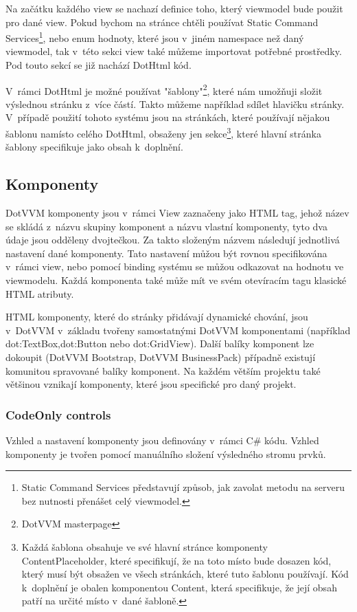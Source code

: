     Na začátku každého view se nachazí definice toho, který viewmodel bude použit pro dané view. Pokud bychom na stránce chtěli používat Static Command Services\footnote{Static Command Services představují způsob, jak zavolat metodu na serveru bez nutnosti přenášet celý viewmodel.}, nebo enum hodnoty, které jsou v~jiném namespace než daný viewmodel, tak v~této sekci view také můžeme importovat potřebné prostředky. Pod touto sekcí se již nachází DotHtml kód.
    
    V~rámci DotHtml je možné používat "šablony"\footnote{DotVVM masterpage}, které nám umožňuji složit výslednou stránku z~více částí. Takto můžeme například sdílet hlavičku stránky. V~případě použití tohoto systému jsou na stránkách, které používají nějakou šablonu namísto celého DotHtml, obsaženy jen sekce\footnote{Každá šablona obsahuje ve své hlavní stránce komponenty ContentPlaceholder, které specifikují, že na toto místo bude dosazen kód, který musí být obsažen ve všech stránkách, které tuto šablonu používají. Kód k~doplnění je obalen komponentou Content, která specifikuje, že její obsah patří na určité místo v~dané šabloně.}, které hlavní stránka šablony specifikuje jako obsah k~doplnění.

\subsection*{Komponenty}
DotVVM komponenty jsou v~rámci View zaznačeny jako HTML tag, jehož název se skládá z~názvu skupiny komponent a názvu vlastní komponenty, tyto dva údaje jsou odděleny dvojtečkou. Za takto složeným názvem následují jednotlivá nastavení dané komponenty. Tato nastavení můžou být rovnou specifikována v~rámci view, nebo pomocí binding systému se můžou odkazovat na hodnotu ve viewmodelu. Každá komponenta také může mít ve svém otevíracím tagu klasické HTML atributy. 

HTML komponenty, které do stránky přidávají dynamické chování, jsou v~DotVVM v~základu tvořeny samostatnými DotVVM komponentami (například dot:TextBox,dot:Button nebo dot:GridView). Další balíky komponent lze dokoupit (DotVVM Bootstrap, DotVVM BusinessPack) případně existují komunitou spravované balíky komponent. Na každém větším projektu také většinou vznikají komponenty, které jsou specifické pro daný projekt.

\subsubsection{CodeOnly controls}
Vzhled a nastavení komponenty jsou definovány v~rámci C\# kódu. Vzhled komponenty je tvořen pomocí manuálního složení výsledného stromu prvků.


